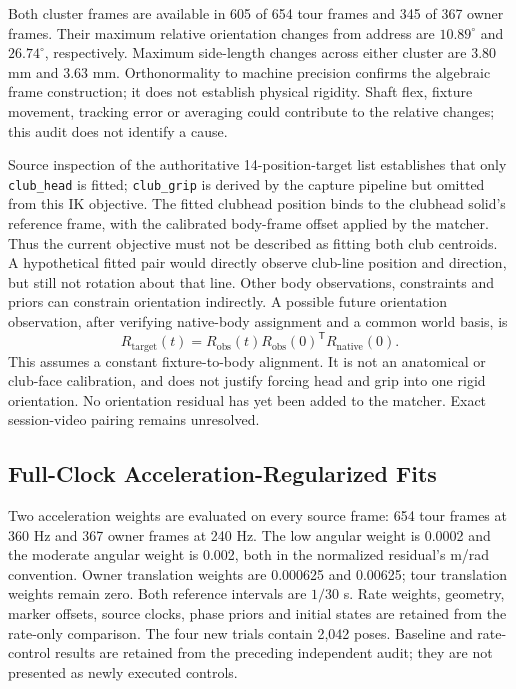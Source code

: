 \documentclass[11pt,a4paper]{article}
\begin{document}
Both cluster frames are available in 605 of 654 tour frames and 345 of 367
owner frames. Their maximum relative orientation changes from address are
$10.89^\circ$ and $26.74^\circ$, respectively. Maximum side-length changes
across either cluster are 3.80 mm and 3.63 mm. Orthonormality to machine
precision confirms the algebraic frame construction; it does not establish
physical rigidity. Shaft flex, fixture movement, tracking error or averaging
could contribute to the relative changes; this audit does not identify a cause.

Source inspection of the authoritative 14-position-target list establishes
that only \texttt{club\_head} is fitted; \texttt{club\_grip} is derived by
the capture pipeline but omitted from this IK objective. The fitted clubhead
position binds to the clubhead solid's reference frame, with the calibrated
body-frame offset applied by the matcher. Thus the current objective must
not be described as fitting both club centroids. A hypothetical fitted pair
would directly observe club-line position and direction, but still not
rotation about that line. Other body observations, constraints and priors
can constrain orientation indirectly. A possible future orientation
observation, after verifying native-body assignment and a common world
basis, is
\[
 R_{\mathrm{target}}(t)=R_{\mathrm{obs}}(t)
 R_{\mathrm{obs}}(0)^{\mathsf T}R_{\mathrm{native}}(0).
\]
This assumes a constant fixture-to-body alignment. It is not an anatomical
or club-face calibration, and does not justify forcing head and grip into
one rigid orientation. No orientation residual has yet been added to the
matcher. Exact session-video pairing remains unresolved.

\subsection{Full-Clock Acceleration-Regularized Fits}
Two acceleration weights are evaluated on every source frame: 654 tour
frames at 360 Hz and 367 owner frames at 240 Hz. The low angular weight is
0.0002 and the moderate angular weight is 0.002, both in the normalized
residual's m/rad convention. Owner translation weights are 0.000625 and
0.00625; tour translation weights remain zero. Both reference intervals
are $1/30$ s. Rate weights, geometry, marker offsets, source clocks, phase
priors and initial states are retained from the rate-only comparison.
The four new trials contain 2,042 poses. Baseline and rate-control results
are retained from the preceding independent audit; they are not presented
as newly executed controls.
\end{document}

